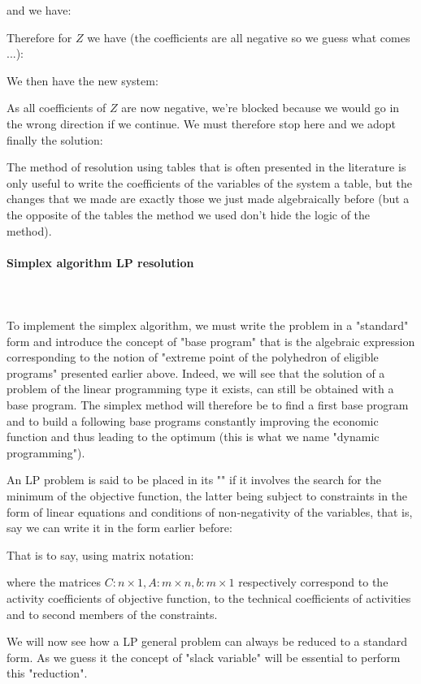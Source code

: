 	and we have:
	
	Therefore for $Z$ we have (the coefficients are all negative so we guess what comes ...):
	
	We then have the new system:
	
	As all coefficients of $Z$ are now negative, we're blocked because we would go in the wrong direction if we continue. We must therefore stop here and we adopt finally the solution:
	
	The method of resolution using tables that is often presented in the literature is only useful to write the coefficients of the variables of the system a table, but the changes that we made are exactly those we just made algebraically before (but a the opposite of the tables the method we used don't hide the logic of the method).
	
	\paragraph{Simplex algorithm LP resolution}\mbox{}\\\\
	To implement the  simplex algorithm, we must write the problem in a "standard" form and introduce the concept of "base program" that is the algebraic expression corresponding to the notion of "extreme point of the polyhedron of eligible programs" presented earlier above. Indeed, we will see that the solution of a problem of the linear programming type it exists, can still be obtained with a base program. The simplex method will therefore be to find a first base program and to build a following base programs constantly improving the economic function and thus leading to the optimum (this is what we name "dynamic programming").
	
	An LP problem is said to be placed in its "" if it involves the search for the minimum of the objective function, the latter being subject to constraints in the form of linear equations and conditions of non-negativity of the variables, that is, say we can write it in the form earlier before:
	
	That is to say, using matrix notation:
	
	where the matrices $C:n\times 1, A:m\times n,b:m \times 1$ respectively correspond to the activity coefficients of objective function, to the technical coefficients of activities and to second members of the constraints.

	We will now see how a LP general problem can always be reduced to a standard form. As we guess it the concept of "slack variable" will be essential to perform this "reduction".

